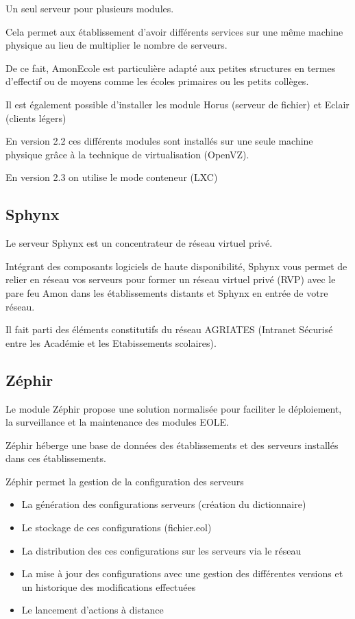 Un seul serveur pour plusieurs modules.

Cela permet aux établissement d'avoir différents services sur une même machine
physique au lieu de multiplier le nombre de serveurs.

De ce fait, AmonEcole est particulière adapté aux petites structures en
termes d'effectif ou de moyens comme les écoles primaires ou les petits
collèges.

Il est également possible d'installer les module Horus (serveur de fichier)
et Eclair (clients légers)

En version 2.2 ces différents modules sont installés sur une seule machine
physique grâce à la technique de virtualisation (OpenVZ).

En version 2.3 on utilise le mode conteneur (LXC)

\subsection{Sphynx}

Le serveur Sphynx est un concentrateur de réseau virtuel privé.

Intégrant des composants logiciels de haute disponibilité, Sphynx vous permet
de relier en réseau vos serveurs pour former un réseau virtuel privé (RVP) 
avec le pare feu Amon dans les établissements distants et Sphynx en entrée de 
votre réseau.

Il fait parti des éléments constitutifs du réseau AGRIATES (Intranet Sécurisé
entre les Académie et les Etabissements scolaires).

\subsection{Zéphir}

Le module Zéphir propose une solution normalisée pour faciliter le
déploiement, la surveillance et la maintenance des modules EOLE.

Zéphir héberge une base de données des établissements et des serveurs 
installés dans ces établissements.

Zéphir permet la gestion de la configuration des serveurs

\begin{itemize}
  \item La génération des configurations serveurs (création du dictionnaire)
  \item Le stockage de ces configurations (fichier.eol)
  \item La distribution des ces configurations sur les serveurs via le réseau
  \item La mise à jour des configurations avec une gestion des différentes 
        versions et un historique des modifications effectuées
  \item Le lancement d'actions à distance
\end{itemize}

